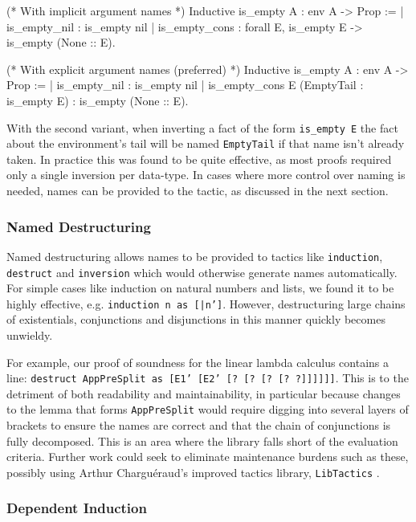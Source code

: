 \documentclass[]{unswthesis}
\let\c\texttt
\begin{document}
\begin{coqcode}
(* With implicit argument names *)
Inductive is_empty {A} : env A -> Prop :=
  | is_empty_nil : is_empty nil
  | is_empty_cons : forall E, is_empty E -> is_empty (None :: E).

(* With explicit argument names (preferred) *)
Inductive is_empty {A} : env A -> Prop :=
  | is_empty_nil : is_empty nil
  | is_empty_cons E (EmptyTail : is_empty E) : is_empty (None :: E).
\end{coqcode}

With the second variant, when inverting a fact of the form \c{is_empty E} the fact about the environment's tail will be named \c{EmptyTail} if that name isn't already taken. In practice this was found to be quite effective, as most proofs required only a single inversion per data-type. In cases where more control over naming is needed, names can be provided to the tactic, as discussed in the next section.

\subsubsection{Named Destructuring}
\label{sec:named-destruct}

Named destructuring allows names to be provided to tactics like \c{induction}, \c{destruct} and \c{inversion} which would otherwise generate names automatically. For simple cases like induction on natural numbers and lists, we found it to be highly effective, e.g. \c{induction n as [|n']}. However, destructuring large chains of existentials, conjunctions and disjunctions in this manner quickly becomes unwieldy.

For example, our proof of soundness for the linear lambda calculus contains a line: \c{destruct AppPreSplit as [E1' [E2' [? [? [? [? ?]]]]]]}. This is to the detriment of both readability and maintainability, in particular because changes to the lemma that forms \c{AppPreSplit} would require digging into several layers of brackets to ensure the names are correct and that the chain of conjunctions is fully decomposed. This is an area where the library falls short of the evaluation criteria. Further work could seek to eliminate maintenance burdens such as these, possibly using Arthur Charguéraud's improved tactics library, \c{LibTactics} \cite{tlc15}.

\subsubsection{Dependent Induction}
\end{document}
